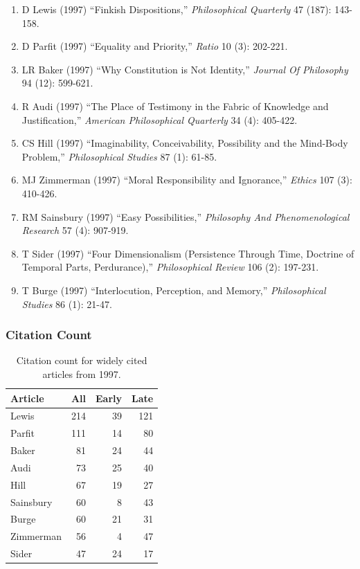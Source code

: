 \documentclass[
  10pt,
  letterpaper,
  DIV=11,
  numbers=noendperiod,
  twoside]{scrartcl}
\providecommand{\tightlist}{%
  \setlength{\itemsep}{0pt}\setlength{\parskip}{0pt}}\usepackage{longtable,booktabs,array}
\begin{document}
\begin{enumerate}
\def\labelenumi{\arabic{enumi}.}
\tightlist
\item
  D Lewis (1997) ``Finkish Dispositions,'' \emph{Philosophical
  Quarterly} 47 (187): 143-158.
\item
  D Parfit (1997) ``Equality and Priority,'' \emph{Ratio} 10 (3):
  202-221.
\item
  LR Baker (1997) ``Why Constitution is Not Identity,'' \emph{Journal Of
  Philosophy} 94 (12): 599-621.
\item
  R Audi (1997) ``The Place of Testimony in the Fabric of Knowledge and
  Justification,'' \emph{American Philosophical Quarterly} 34 (4):
  405-422.
\item
  CS Hill (1997) ``Imaginability, Conceivability, Possibility and the
  Mind-Body Problem,'' \emph{Philosophical Studies} 87 (1): 61-85.
\item
  MJ Zimmerman (1997) ``Moral Responsibility and Ignorance,''
  \emph{Ethics} 107 (3): 410-426.
\item
  RM Sainsbury (1997) ``Easy Possibilities,'' \emph{Philosophy And
  Phenomenological Research} 57 (4): 907-919.
\item
  T Sider (1997) ``Four Dimensionalism (Persistence Through Time,
  Doctrine of Temporal Parts, Perdurance),'' \emph{Philosophical Review}
  106 (2): 197-231.
\item
  T Burge (1997) ``Interlocution, Perception, and Memory,''
  \emph{Philosophical Studies} 86 (1): 21-47.
\end{enumerate}

\subsubsection*{Citation Count}\label{sec-count-1997}

\begin{longtable}[]{@{}lrrr@{}}

\caption{\label{tbl-citation-count-1997}Citation count for widely cited
articles from 1997.}

\tabularnewline

\toprule\noalign{}
Article & All & Early & Late \\
\midrule\noalign{}
\endhead
\bottomrule\noalign{}
\endlastfoot
Lewis & 214 & 39 & 121 \\
Parfit & 111 & 14 & 80 \\
Baker & 81 & 24 & 44 \\
Audi & 73 & 25 & 40 \\
Hill & 67 & 19 & 27 \\
Sainsbury & 60 & 8 & 43 \\
Burge & 60 & 21 & 31 \\
Zimmerman & 56 & 4 & 47 \\
Sider & 47 & 24 & 17 \\

\end{longtable}
\end{document}

